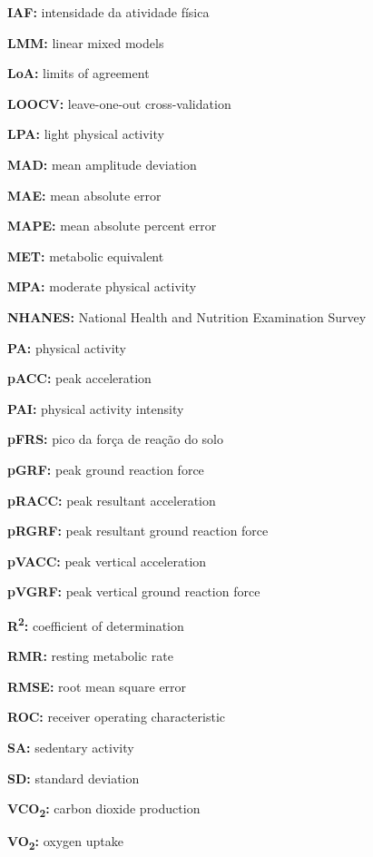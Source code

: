 \documentclass[12pt]{article}
\begin{document}
\noindent \textbf{IAF:} intensidade da atividade física

\noindent \textbf{LMM:} linear mixed models

\noindent \textbf{LoA:} limits of agreement

\noindent \textbf{LOOCV:} leave-one-out cross-validation

\noindent \textbf{LPA:} light physical activity

\noindent \textbf{MAD:} mean amplitude deviation

\noindent \textbf{MAE:} mean absolute error

\noindent \textbf{MAPE:} mean absolute percent error

\noindent \textbf{MET:} metabolic equivalent

\noindent \textbf{MPA:} moderate physical activity

\noindent \textbf{NHANES:} National Health and Nutrition Examination Survey

\noindent \textbf{PA:} physical activity

\noindent \textbf{pACC:} peak acceleration

\noindent \textbf{PAI:} physical activity intensity

\noindent \textbf{pFRS:} pico da força de reação do solo

\noindent \textbf{pGRF:} peak ground reaction force

\noindent \textbf{pRACC:} peak resultant acceleration

\noindent \textbf{pRGRF:} peak resultant ground reaction force

\noindent \textbf{pVACC:} peak vertical acceleration

\noindent \textbf{pVGRF:} peak vertical ground reaction force

\noindent \textbf{R\textsuperscript{2}:} coefficient of determination

\noindent \textbf{RMR:} resting metabolic rate

\noindent \textbf{RMSE:} root mean square error

\noindent \textbf{ROC:} receiver operating characteristic

\noindent \textbf{SA:} sedentary activity

\noindent \textbf{SD:} standard deviation

\noindent \textbf{VCO\textsubscript{2}:} carbon dioxide production

\noindent \textbf{VO\textsubscript{2}:} oxygen uptake
\end{document}
